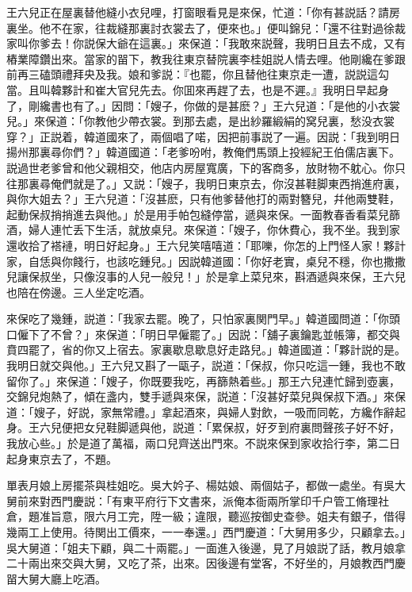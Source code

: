 王六兒正在屋裏替他縫小衣兒哩，打窗眼看見是來保，忙道：「你有甚説話？請房裏坐。他不在家，往裁縫那裏討衣裳去了，便來也。」便叫錦兒：「還不往對過徐裁家叫你爹去！你説保大爺在這裏。」來保道：「我敢來説聲，我明日且去不成，又有樁業障鑽出來。當家的㽞下，教我往東京替院裏李桂姐説人情去哩。他剛纔在爹跟前再三磕頭禮拜央及我。娘和爹説：『也罷，你且替他往東京走一遭，説説這勾當。且叫韓夥計和崔大官兒先去。你囬來再趕了去，也是不遲。』我明日早起身了，剛纔書也有了。」因問：「嫂子，你做的是甚麽？」王六兒道：「是他的小衣裳兒。」來保道：「你教他少帶衣裳。到那去處，是出紗羅緞絹的窝兒裏，愁没衣裳穿？」正説着，韓道國來了，兩個唱了喏，因把前事説了一遍。因説：「我到明日揚州那裏尋你們？」韓道國道：「老爹吩咐，教俺們馬頭上投經紀王伯儒店裏下。説過世老爹曾和他父親相交，他店内房屋寬廣，下的客商多，放財物不躭心。你只往那裏尋俺們就是了。」又説：「嫂子，我明日東京去，你沒甚鞋脚東西捎進府裏，與你大姐去？」王六兒道：「沒甚麽，只有他爹替他打的兩對簪兒，幷他兩雙鞋，起動保叔捎捎進去與他。」於是用手帕包縫停當，遞與來保。一面教春香看菜兒篩酒，婦人連忙丢下生活，就放桌兒。來保道：「嫂子，你休費心，我不坐。我到家還收拾了褡褳，明日好起身。」王六兒笑嘻嘻道：「耶嚛，你怎的上門怪人家！夥計家，自恁與你餞行，也該吃鍾兒。」因説韓道國：「你好老實，桌兒不穩，你也撒撒兒讓保叔坐，只像沒事的人兒一般兒！」於是拿上菜兒來，斟酒遞與來保，王六兒也陪在傍邊。三人坐定吃酒。

來保吃了幾鍾，説道：「我家去罷。晚了，只怕家裏関門早。」韓道國問道：「你頭口僱下了不曾？」來保道：「明日早僱罷了。」因説：「舖子裏鑰匙並帳簿，都交與賁四罷了，省的你又上宿去。家裏歇息歇息好走路兒。」韓道國道：「夥計説的是。我明日就交與他。」王六兒又斟了一甌子，説道：「保叔，你只吃這一鍾，我也不敢留你了。」來保道：「嫂子，你既要我吃，再篩熱着些。」那王六兒連忙歸到壺裏，交錦兒炮熱了，傾在盞内，雙手遞與來保，説道：「沒甚好菜兒與保叔下酒。」來保道：「嫂子，好説，家無常禮。」拿起酒來，與婦人對飲，一吸而同乾，方纔作辭起身。王六兒便把女兒鞋脚遞與他，説道：「累保叔，好歹到府裏問聲孩子好不好，我放心些。」於是道了萬福，兩口兒齊送出門來。不説來保到家收拾行李，第二日起身東京去了，不題。

單表月娘上房擺茶與桂姐吃。吳大妗子、楊姑娘、兩個姑子，都做一處坐。有吳大舅前來對西門慶説：「有東平府行下文書來，派俺本衙兩所掌印千户管工脩理社倉，題准旨意，限六月工完，陞一級；違限，聽巡按御史查參。姐夫有銀子，借得幾兩工上使用。待関出工價來，一一奉還。」西門慶道：「大舅用多少，只顧拿去。」吳大舅道：「姐夫下顧，與二十兩罷。」一面進入後邊，見了月娘説了話，教月娘拿二十兩出來交與大舅，又吃了茶，出來。因後邊有堂客，不好坐的，月娘教西門慶㽞大舅大廳上吃酒。

